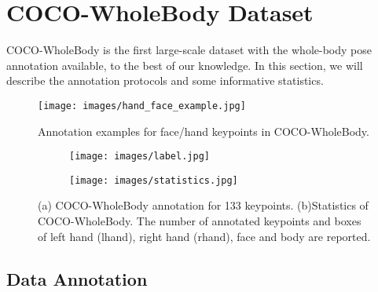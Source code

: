 \documentclass[runningheads]{llncs}
\begin{document}
	\section{COCO-WholeBody Dataset}
	COCO-WholeBody is the first large-scale dataset with the whole-body pose annotation available, to the best of our knowledge. In this section, we will describe the annotation protocols and some informative statistics.
	
	
	\begin{figure*}[tb]
		\centering
		\texttt{[image: images/hand\_face\_example.jpg]}
		\caption{Annotation examples for face/hand keypoints in COCO-WholeBody.}
		\label{fig:anno_hand_face_example}
	\end{figure*}
	
	
	\begin{figure}[tb]
		\centering
		\begin{subfigure}[b]{0.4\textwidth}
			\centering
			\texttt{[image: images/label.jpg]}
			\caption{}
			\label{fig:anno_kpt}
		\end{subfigure}
		\begin{subfigure}[b]{0.55\textwidth}
			\centering
			\texttt{[image: images/statistics.jpg]}
			\caption{}
			\label{fig:number_statistics}
		\end{subfigure}
		\caption{(a) COCO-WholeBody annotation for 133 keypoints. (b)Statistics of COCO-WholeBody. The number of annotated keypoints and boxes of left hand (lhand), right hand (rhand), face and body are reported.}
	\end{figure}
	
	
	\subsection{Data Annotation}
	
\end{document}

